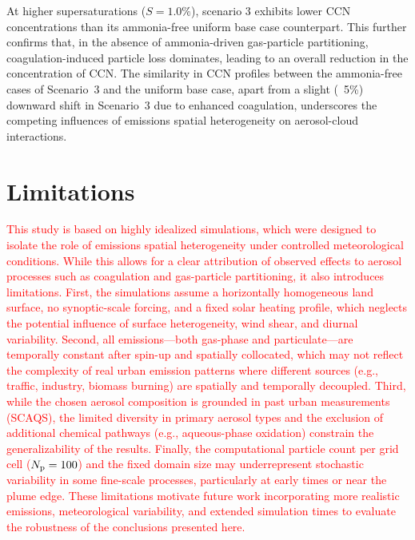 \documentclass[journal abbreviation, manuscript]{copernicus}
\begin{document}
At higher supersaturations ($S=1.0\%$), scenario 3 exhibits lower CCN
concentrations than its ammonia-free uniform base case
counterpart. This further confirms that, in the absence of
ammonia-driven gas-particle partitioning, coagulation-induced particle
loss dominates, leading to an overall reduction in the concentration of 
CCN. The similarity in CCN profiles between the ammonia-free
cases of Scenario~3 and the uniform base case, apart from a slight
(~5\%) downward shift in Scenario~3 due to enhanced coagulation,
underscores the competing influences of emissions spatial
heterogeneity on aerosol-cloud interactions.

\section{Limitations}
\textcolor{red}{ This study is based on highly idealized simulations,
  which were designed to isolate the role of emissions spatial
  heterogeneity under controlled meteorological conditions. While this
  allows for a clear attribution of observed effects to aerosol
  processes such as coagulation and gas-particle partitioning, it also
  introduces limitations. First, the simulations assume a horizontally
  homogeneous land surface, no synoptic-scale forcing, and a fixed
  solar heating profile, which neglects the potential influence of
  surface heterogeneity, wind shear, and diurnal variability. Second,
  all emissions—both gas-phase and particulate—are temporally constant
  after spin-up and spatially collocated, which may not reflect the
  complexity of real urban emission patterns where different sources
  (e.g., traffic, industry, biomass burning) are spatially and
  temporally decoupled. Third, while the chosen aerosol composition is
  grounded in past urban measurements (SCAQS), the limited diversity
  in primary aerosol types and the exclusion of additional chemical
  pathways (e.g., aqueous-phase oxidation) constrain the
  generalizability of the results. Finally, the computational particle
  count per grid cell ($N_{\rm p} = 100$) and the fixed domain size
  may underrepresent stochastic variability in some fine-scale
  processes, particularly at early times or near the plume edge. These
  limitations motivate future work incorporating more realistic
  emissions, meteorological variability, and extended simulation times
  to evaluate the robustness of the conclusions presented here.}


\conclusions  %
\end{document}
